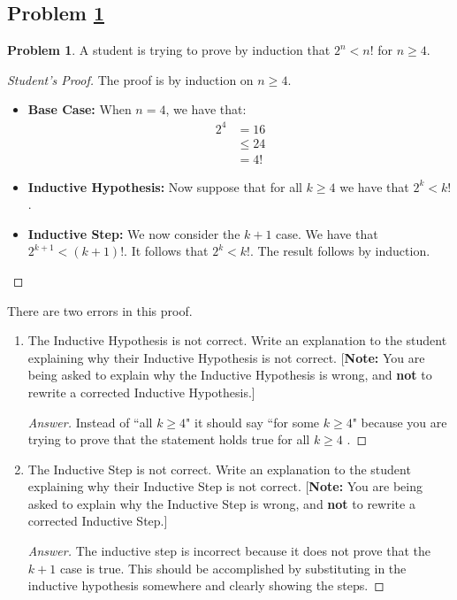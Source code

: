 \documentclass[11pt]{article}
\theoremstyle{definition}
\theoremstyle{definition}
\newtheorem{required}{Problem}
\theoremstyle{definition}
\begin{document}
\subsection{Problem \ref{Induction1}}
\begin{required} \label{Induction1}
A student is trying to prove by induction that $2^{n} < n!$ for $n \geq 4$. 

\begin{proof}[Student's Proof]
The proof is by induction on $n \geq 4$. 
\begin{itemize}
\item \textbf{Base Case:} When $n = 4$, we have that:
\begin{align*}
2^{4} &= 16 \\
&\leq 24 \\
&= 4!
\end{align*}

\item \textbf{Inductive Hypothesis:} Now suppose that for all $k \geq 4$ we have that $2^{k} < k!$. 

\item \textbf{Inductive Step:} We now consider the $k+1$ case. We have that $2^{k+1} < (k+1)!$. It follows that $2^{k} < k!$. The result follows by induction.
\end{itemize}
\end{proof}

There are two errors in this proof. 
\begin{enumerate}[label=(\alph*)]
\item The Inductive Hypothesis is not correct. Write an explanation to the student explaining why their Inductive Hypothesis is not correct. [\textbf{Note:} You are being asked to explain why the Inductive Hypothesis is wrong, and \textbf{not} to rewrite a corrected Inductive Hypothesis.]


\begin{proof}[Answer]
Instead of ``all $k \geq 4$" it should say ``for some $k \geq 4$" because you are trying to prove that the statement holds true for all $k \geq 4$ . 
\end{proof}



\vskip 15pt
\item The Inductive Step is not correct. Write an explanation to the student explaining why their Inductive Step is not correct. [\textbf{Note:} You are being asked to explain why the Inductive Step is wrong, and \textbf{not} to rewrite a corrected Inductive Step.]

\begin{proof}[Answer]
The inductive step is incorrect because it does not prove that the $k+1$ case is true. This should be accomplished by substituting in the inductive hypothesis somewhere and clearly showing the steps.
\end{proof}
\end{enumerate}
\end{required}
\end{document}
